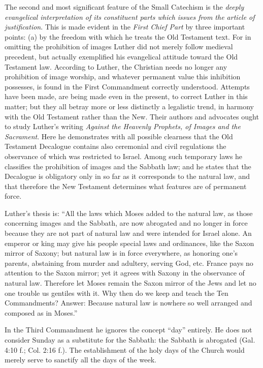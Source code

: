 The second and most significant feature of the Small Catechism is the \emph{deeply evangelical interpretation of its constituent parts which issues from the article of justification}. This is made evident in the \emph{First Chief Part} by three important points: (a) by the freedom with which he treats the Old Testament text. For in omitting the prohibition of images Luther did not merely follow medieval precedent, but actually exemplified his evangelical attitude toward the Old Testament law. According to Luther, the Christian needs no longer any prohibition of image worship, and whatever permanent value this inhibition possesses, is found in the First Commandment correctly understood. Attempts have been made, are being made even in the present, to correct Luther in this matter; but they all betray more or less distinctly a legalistic trend, in harmony with the Old Testament rather than the New. Their authors and advocates ought to study Luther’s writing \emph{Against the Heavenly Prophets, of Images and the Sacrament}. Here he demonstrates with all possible clearness that the Old Testament Decalogue contains also ceremonial and civil regulations the observance of which was restricted to Israel. Among such temporary laws he classifies the prohibition of images and the Sabbath law; and he states that the Decalogue is obligatory only in so far as it corresponds to the natural law, and that therefore the New Testament determines what features are of permanent force.

Luther’s thesis is: “All the laws which Moses added to the natural
law, as those concerning images and the Sabbath, are now abrogated and no longer in force because they are not part of natural law and were intended for Israel alone. An emperor or king may give his people special laws and ordinances, like the Saxon mirror of Saxony; but natural law is in force everywhere, as honoring one’s parents, abstaining from murder and adultery, serving God, etc. France pays no attention to the Saxon mirror; yet it agrees with Saxony in the observance of natural law. Therefore let Moses remain the Saxon mirror of the Jews and let no one trouble us gentiles with it. Why then do we keep and teach the Ten Commandments? Answer: Because natural law is nowhere so well arranged and composed as in Moses.”

In the Third Commandment he ignores the concept “day” entirely. He does not consider Sunday as a substitute for the Sabbath: the Sabbath is abrogated (Gal. 4:10 f.; Col. 2:16 f.). The establishment of the holy days of the Church would merely serve to sanctify all the days of the week.

